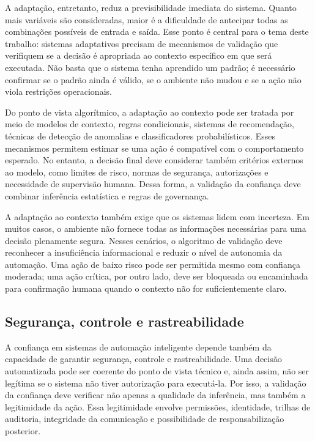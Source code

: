\documentclass[12pt]{article}
\begin{document}
A adaptação, entretanto, reduz a previsibilidade imediata do sistema. Quanto mais variáveis são consideradas, maior é a dificuldade de antecipar todas as combinações possíveis de entrada e saída. Esse ponto é central para o tema deste trabalho: sistemas adaptativos precisam de mecanismos de validação que verifiquem se a decisão é apropriada ao contexto específico em que será executada. Não basta que o sistema tenha aprendido um padrão; é necessário confirmar se o padrão ainda é válido, se o ambiente não mudou e se a ação não viola restrições operacionais.

Do ponto de vista algorítmico, a adaptação ao contexto pode ser tratada por meio de modelos de contexto, regras condicionais, sistemas de recomendação, técnicas de detecção de anomalias e classificadores probabilísticos. Esses mecanismos permitem estimar se uma ação é compatível com o comportamento esperado. No entanto, a decisão final deve considerar também critérios externos ao modelo, como limites de risco, normas de segurança, autorizações e necessidade de supervisão humana. Dessa forma, a validação da confiança deve combinar inferência estatística e regras de governança.

A adaptação ao contexto também exige que os sistemas lidem com incerteza. Em muitos casos, o ambiente não fornece todas as informações necessárias para uma decisão plenamente segura. Nesses cenários, o algoritmo de validação deve reconhecer a insuficiência informacional e reduzir o nível de autonomia da automação. Uma ação de baixo risco pode ser permitida mesmo com confiança moderada; uma ação crítica, por outro lado, deve ser bloqueada ou encaminhada para confirmação humana quando o contexto não for suficientemente claro.

\subsection{Segurança, controle e rastreabilidade}

A confiança em sistemas de automação inteligente depende também da capacidade de garantir segurança, controle e rastreabilidade. Uma decisão automatizada pode ser coerente do ponto de vista técnico e, ainda assim, não ser legítima se o sistema não tiver autorização para executá-la. Por isso, a validação da confiança deve verificar não apenas a qualidade da inferência, mas também a legitimidade da ação. Essa legitimidade envolve permissões, identidade, trilhas de auditoria, integridade da comunicação e possibilidade de responsabilização posterior.
\end{document}
